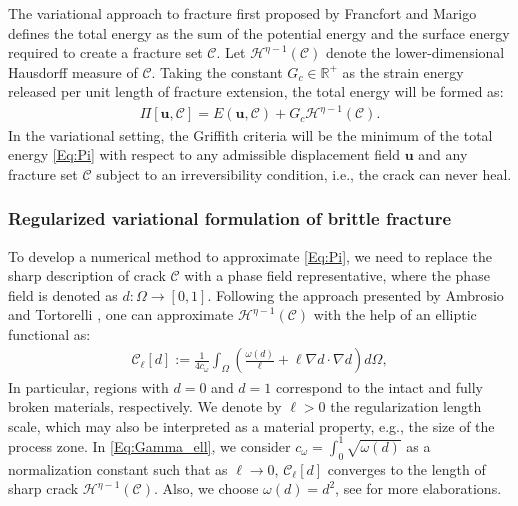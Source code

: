 The variational approach to fracture first proposed by Francfort and Marigo \cite{bourdin2008variational} defines the total energy as the sum of the potential energy and the surface energy required to create a fracture set $\mathcal{C}$. Let $\mathcal{H}^{\eta-1}(\mathcal{C})$ denote the lower-dimensional Hausdorff measure of $\mathcal{C}$. Taking the constant $G_c\in\mathbb{R}^+$ as the strain energy released per unit length of fracture extension, the total energy will be formed as:
\begin{equation}\label{Eq:Pi}
	\begin{aligned}
		\Pi[\bm{u},\mathcal{C}]=E(\bm{u},\mathcal{C})+G_c\mathcal{H}^{\eta-1}(\mathcal{C}).
	\end{aligned}
\end{equation}
In the variational setting, the Griffith criteria will be the
minimum of the total energy \eqref{Eq:Pi} with respect to any admissible displacement field $\bm{u}$ and any fracture set $\mathcal{C}$ subject to an irreversibility condition, i.e., the crack can never heal.

\subsubsection{Regularized variational formulation of brittle fracture}
To develop a numerical method to approximate \eqref{Eq:Pi}, we need to replace the sharp description of crack $\mathcal{C}$ with a phase field representative, where the phase field is denoted as $d:\Omega\rightarrow[0,1]$. Following the approach presented by Ambrosio and Tortorelli \cite{ambrosio1990approximation, ambrosio1992approximation}, one can approximate $\mathcal{H}^{\eta-1}(\mathcal{C})$ with the help of an elliptic functional as:
\begin{equation}\label{Eq:Gamma_ell}
\begin{aligned}
\mathcal{C}_\ell[d]:=\frac{1}{4c_{\omega}}\int_\Omega\left(\frac{\omega(d)}{\ell} + \ell \nabla d\cdot\nabla d\right) d\Omega,  
\end{aligned}
\end{equation}
In particular, regions with $d = 0$ and $d = 1$ correspond to the intact and fully broken materials, respectively.
We denote by $\ell>0$ the regularization length scale, which may also be interpreted as a material property, e.g., the size of the process zone.
In \eqref{Eq:Gamma_ell}, we consider $c_\omega=\int_{0}^{1} \sqrt{\omega(d)}$ as a normalization constant such that as $\ell\rightarrow 0$, $\mathcal{C}_\ell[d]$ converges to the length of sharp crack $\mathcal{H}^{\eta-1}(\mathcal{C})$. Also, we choose $\omega(d)=d^2$, see \cite{tanne2018crack, Bourdin2014014301} for more elaborations.

